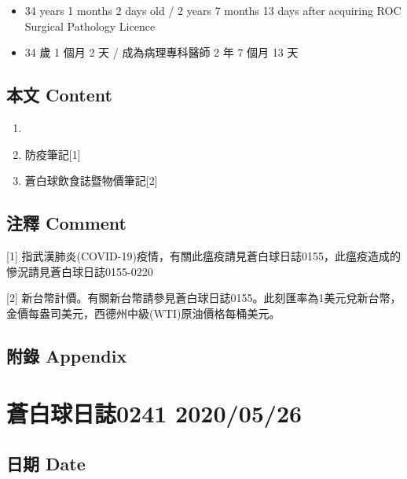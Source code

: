 \documentclass[
]{article}
\providecommand{\tightlist}{%
  \setlength{\itemsep}{0pt}\setlength{\parskip}{0pt}}
\begin{document}
\begin{itemize}
\tightlist
\item
  34 years 1 months 2 days old / 2 years 7 months 13 days after
  acquiring ROC Surgical Pathology Licence
\item
  34 歲 1 個月 2 天 / 成為病理專科醫師 2 年 7 個月 13 天
\end{itemize}

\hypertarget{ux672cux6587-content-24}{%
\subsection{本文 Content}\label{ux672cux6587-content-24}}

\begin{enumerate}
\def\labelenumi{\arabic{enumi}.}
\item
\item
  防疫筆記{[}1{]}
\item
  蒼白球飲食誌暨物價筆記{[}2{]}
\end{enumerate}

\hypertarget{ux6ce8ux91cb-comment-24}{%
\subsection{注釋 Comment}\label{ux6ce8ux91cb-comment-24}}

{[}1{]}
指武漢肺炎(COVID-19)疫情，有關此瘟疫請見蒼白球日誌0155，此瘟疫造成的慘況請見蒼白球日誌0155-0220

{[}2{]}
新台幣計價。有關新台幣請參見蒼白球日誌0155。此刻匯率為1美元兌新台幣，金價每盎司美元，西德州中級(WTI)原油價格每桶美元。

\hypertarget{ux9644ux9304-appendix-24}{%
\subsection{附錄 Appendix}\label{ux9644ux9304-appendix-24}}

\hypertarget{ux84bcux767dux7403ux65e5ux8a8c0241-20200526}{%
\section{蒼白球日誌0241
2020/05/26}\label{ux84bcux767dux7403ux65e5ux8a8c0241-20200526}}

\hypertarget{ux65e5ux671f-date-25}{%
\subsection{日期 Date}\label{ux65e5ux671f-date-25}}
\end{document}
